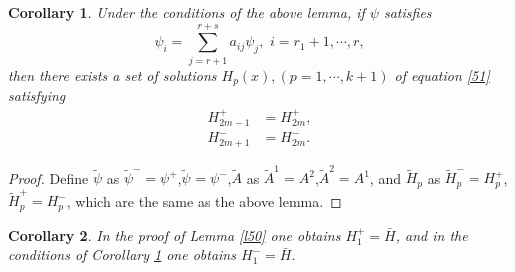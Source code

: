 \documentclass[a4paper,reqno,11pt]{amsart}
\numberwithin{equation}{section} %
\newtheorem*{cor}{Corollary}
\begin{document}
\begin{cor}\label{l51}
	Under the conditions of the above lemma, if $\psi$ satisfies
	\begin{equation}\label{515}
		\psi _i=\sum_{j=r+1}^{r+s}{a_{ij}\psi _j ,\,\,i=r_1+1,\cdots ,r,}
	\end{equation}
	then there exists a set of solutions $H_p (x), (p = 1, \cdots , k+1)$ of equation \eqref{51} satisfying
	\begin{align}
		H^{+}_{2m-1} &= H^{+}_{2m}\label{516} ,\\
		H^{-}_{2m+1} &= H^{-}_{2m}\label{517} .
	\end{align}
\end{cor}
\begin{proof}
	Define $\tilde{\psi} $ as $\tilde{\psi}^{-}=\psi ^{+}$,$\tilde{\psi}^{}=\psi ^{-}$,$\tilde{A}$ as $\tilde{A}^{1}=A ^{2}$,$\tilde{A}^{2}=A ^{1}$, and $\tilde{H}_p$ as $\tilde{H}_p^{-}=H_p ^{+}$,$\tilde{H}_p^{+}=H_p ^{-}$, which are the same as the above lemma. 
\end{proof}
\begin{cor}\label{l52}
	In the proof of Lemma \ref{l50} one obtains $H_1^{+}=\bar{H} $, and in the conditions of Corollary \ref{l51} one obtains $H_1^{-}=\bar{H} $.
\end{cor}






%
%
%



%
%
%
%
%
%
%
%
\end{document}

